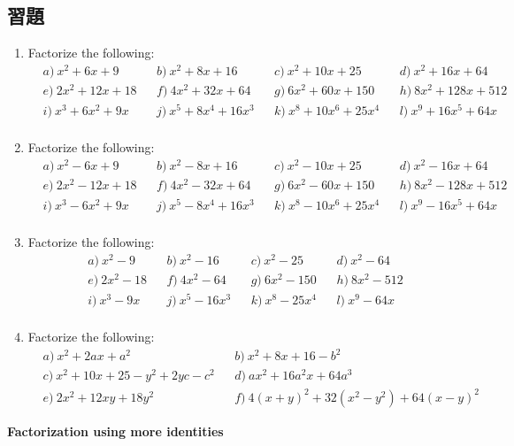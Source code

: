 \documentclass[12pt]{article}
\begin{document}
    \subsection*{習題}
    \begin{enumerate}
        \item Factorize the following:\begin{align*}
            &a)\ x^2+6x+9&&b)\ x^2+8x+16&&c)\ x^2+10x+25&&d)\ x^2+16x+64\\
            &e)\ 2x^2+12x+18&&f)\ 4x^2+32x+64&&g)\ 6x^2+60x+150&&h)\ 8x^2+128x+512\\
            &i)\ x^3+6x^2+9x&&j)\ x^5+8x^4+16x^3&&k)\ x^8+10x^6+25x^4&&l)\ x^9+16x^5+64x\\
        \end{align*}
        \item Factorize the following:\begin{align*}
            &a)\ x^2-6x+9&&b)\ x^2-8x+16&&c)\ x^2-10x+25&&d)\ x^2-16x+64\\
            &e)\ 2x^2-12x+18&&f)\ 4x^2-32x+64&&g)\ 6x^2-60x+150&&h)\ 8x^2-128x+512\\
            &i)\ x^3-6x^2+9x&&j)\ x^5-8x^4+16x^3&&k)\ x^8-10x^6+25x^4&&l)\ x^9-16x^5+64x\\
        \end{align*}
        \item Factorize the following:\begin{align*}
            &a)\ x^2-9&&b)\ x^2-16&&c)\ x^2-25&&d)\ x^2-64\\
            &e)\ 2x^2-18&&f)\ 4x^2-64&&g)\ 6x^2-150&&h)\ 8x^2-512\\
            &i)\ x^3-9x&&j)\ x^5-16x^3&&k)\ x^8-25x^4&&l)\ x^9-64x\\
        \end{align*}
        \item Factorize the following:\begin{align*}
            &a)\ x^2+2ax+a^2&&b)\ x^2+8x+16-b^2\\
            &c)\ x^2+10x+25-y^2+2yc-c^2&&d)\ ax^2+16a^2x+64a^3\\
            &e)\ 2x^2+12xy+18y^2&&f)\ 4(x+y)^2+32(x^2-y^2)+64(x-y)^2
        \end{align*}
    \end{enumerate}

    \begin{center}
        \textbf{Factorization using more identities}
    \end{center}
\end{document}
